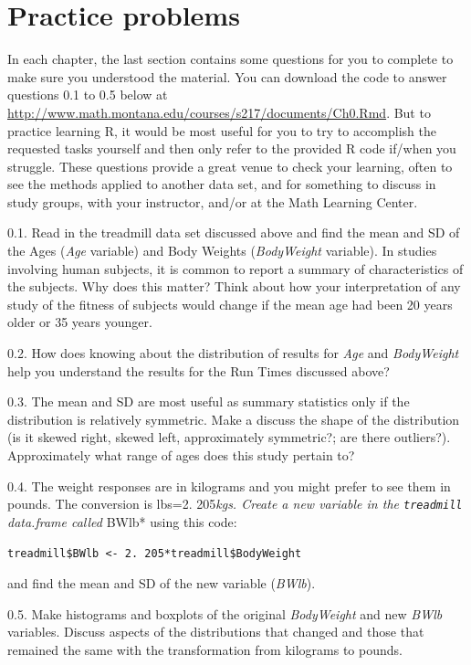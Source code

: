 \documentclass[]{book}
\begin{document}
\section{Practice problems}\label{practice-problems}

In each chapter, the last section contains some questions for you to
complete to make sure you understood the material. You can download the
code to answer questions 0.1 to 0.5 below at
\url{http://www.math.montana.edu/courses/s217/documents/Ch0.Rmd}. But to
practice learning R, it would be most useful for you to try to
accomplish the requested tasks yourself and then only refer to the
provided R code if/when you struggle. These questions provide a great
venue to check your learning, often to see the methods applied to
another data set, and for something to discuss in study groups, with
your instructor, and/or at the Math Learning Center.

0.1. Read in the treadmill data set discussed above and find the mean
and SD of the Ages (\emph{Age} variable) and Body Weights
(\emph{BodyWeight} variable). In studies involving human subjects, it is
common to report a summary of characteristics of the subjects. Why does
this matter? Think about how your interpretation of any study of the
fitness of subjects would change if the mean age had been 20 years older
or 35 years younger.

0.2. How does knowing about the distribution of results for \emph{Age}
and \emph{BodyWeight} help you understand the results for the Run Times
discussed above?

0.3. The mean and SD are most useful as summary statistics only if the
distribution is relatively symmetric. Make a discuss the shape of the
distribution (is it skewed right, skewed left, approximately symmetric?;
are there outliers?). Approximately what range of ages does this study
pertain to?

0.4. The weight responses are in kilograms and you might prefer to see
them in pounds. The conversion is lbs=2. 205\emph{kgs. Create a new
variable in the \texttt{treadmill}\\
data.frame called }BWlb* using this code:

\texttt{treadmill\$BWlb\ \textless{}-\ 2.\ 205*treadmill\$BodyWeight}

and find the mean and SD of the new variable (\emph{BWlb}).

0.5. Make histograms and boxplots of the original \emph{BodyWeight} and
new \emph{BWlb} variables. Discuss aspects of the distributions that
changed and those that remained the same with the transformation from
kilograms to pounds.
\end{document}
